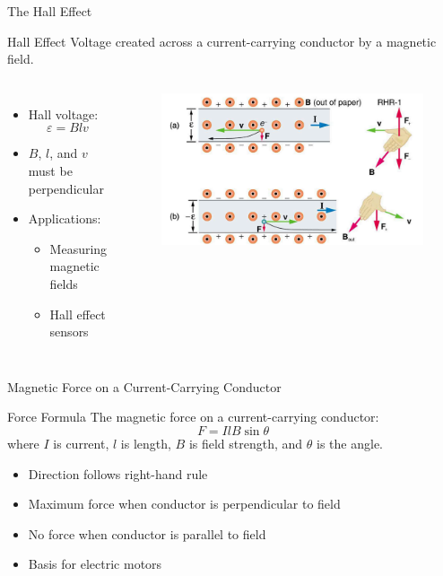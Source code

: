 \documentclass{beamer}
\begin{document}
\begin{frame}{The Hall Effect}
\begin{block}{Hall Effect}
Voltage created across a current-carrying conductor by a magnetic field.
\end{block}

\begin{columns}
\begin{itemize}
\item Hall voltage:
\begin{equation}
\varepsilon = Blv
\end{equation}
\item $B$, $l$, and $v$ must be perpendicular
\item Applications:
\begin{itemize}
\item Measuring magnetic fields
\item Hall effect sensors
\end{itemize}
\end{itemize}

\begin{figure}
\centering
\includegraphics[width=1\linewidth]{halleffct.png}
\end{figure}
\end{columns}
\end{frame}

\begin{frame}{Magnetic Force on a Current-Carrying Conductor}
\begin{block}{Force Formula}
The magnetic force on a current-carrying conductor:
\begin{equation}
F = IlB\sin\theta
\end{equation}
where $I$ is current, $l$ is length, $B$ is field strength, and $\theta$ is the angle.
\end{block}

\begin{itemize}
\item Direction follows right-hand rule
\item Maximum force when conductor is perpendicular to field
\item No force when conductor is parallel to field
\item Basis for electric motors
\end{itemize}
\end{frame}
\end{document}
